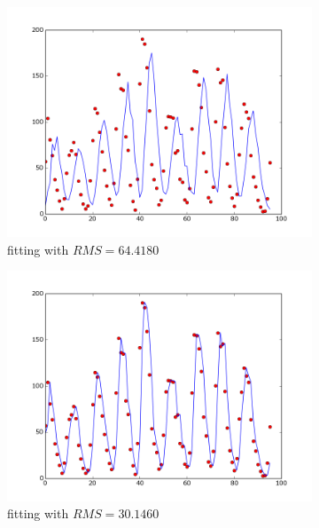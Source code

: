 \documentclass{article}
\begin{document}
\begin{figure}[!ht]
    \centering
    \begin{subfigure}[b]{0.4\textwidth}
        \includegraphics[width=\textwidth]{Part2/II211.png}
        \caption{fitting with $RMS = 64.4180$}
    \end{subfigure}
    \begin{subfigure}[b]{0.4\textwidth}
        \includegraphics[width=\textwidth]{Part2/II212.png}
        \caption{fitting with $RMS = 30.1460$}
    \end{subfigure}
    \begin{subfigure}[b]{0.4\textwidth}

\end{subfigure}
\end{figure}
\end{document}
